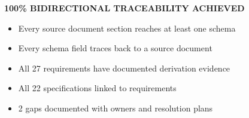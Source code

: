 \vspace{0.5cm}

\begin{tcolorbox}[colback=sourcegreen!5,colframe=sourcegreen!70,title=\textbf{Traceability Validation Status}]
\begin{center}
\Large\textbf{100\% BIDIRECTIONAL TRACEABILITY ACHIEVED}
\end{center}
\begin{itemize}[noitemsep]
  \item[\textcolor{sourcegreen}{\ding{51}}] Every source document section reaches at least one schema
  \item[\textcolor{sourcegreen}{\ding{51}}] Every schema field traces back to a source document
  \item[\textcolor{sourcegreen}{\ding{51}}] All 27 requirements have documented derivation evidence
  \item[\textcolor{sourcegreen}{\ding{51}}] All 22 specifications linked to requirements
  \item[\textcolor{sapamber}{\ding{51}}] 2 gaps documented with owners and resolution plans
\end{itemize}
\end{tcolorbox}